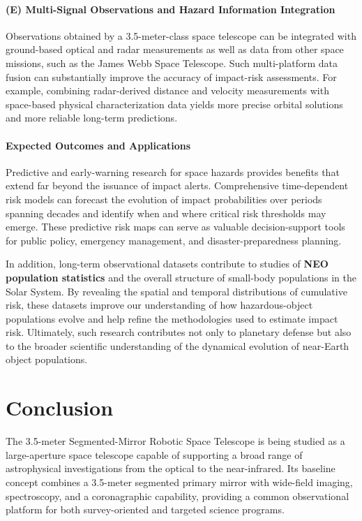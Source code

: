 \subsubsection{(E) Multi-Signal Observations and Hazard Information Integration}\label{e-multi-signal-observations-and-hazard-information-integration}

Observations obtained by a 3.5-meter-class space telescope can be integrated with ground-based optical and radar measurements as well as data from other space missions, such as the James Webb Space Telescope. Such multi-platform data fusion can substantially improve the accuracy of impact-risk assessments. For example, combining radar-derived distance and velocity measurements with space-based physical characterization data yields more precise orbital solutions and more reliable long-term predictions.

\subsubsection{Expected Outcomes and Applications}

Predictive and early-warning research for space hazards provides benefits that extend far beyond the issuance of impact alerts. Comprehensive time-dependent risk models can forecast the evolution of impact probabilities over periods spanning decades and identify when and where critical risk thresholds may emerge. These predictive risk maps can serve as valuable decision-support tools for public policy, emergency management, and disaster-preparedness planning.

In addition, long-term observational datasets contribute to studies of \textbf{NEO population statistics} and the overall structure of small-body populations in the Solar System. By revealing the spatial and temporal distributions of cumulative risk, these datasets improve our understanding of how hazardous-object populations evolve and help refine the methodologies used to estimate impact risk. Ultimately, such research contributes not only to planetary defense but also to the broader scientific understanding of the dynamical evolution of near-Earth object populations.

\chapter{Conclusion}

The 3.5-meter Segmented-Mirror Robotic Space Telescope is being studied as
a large-aperture space telescope capable of supporting a broad range of
astrophysical investigations from the optical to the near-infrared. Its
baseline concept combines a 3.5-meter segmented primary mirror with
wide-field imaging, spectroscopy, and a coronagraphic capability, providing
a common observational platform for both survey-oriented and targeted
science programs.

